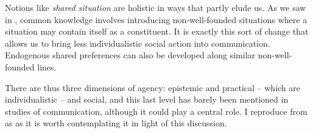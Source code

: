 Notions like \emph{shared situation} are holistic in ways that partly elude us. As we saw in , common knowledge involves introducing non-well-founded situations where a situation may contain itself as a constituent. It is exactly this sort of change that allows us to bring less individualistic social action into communication. Endogenous shared preferences can also be developed along similar non-well-founded lines.


There are thus three dimensions of agency: epistemic and practical -- which are individualistic -- and social, and this last level has barely been mentioned in studies of communication, although it could play a central role. I reproduce  from  as  as it is worth contemplating it in light of this discussion.

\begin{table}
\caption{Summary of Theories of Communication\label{table:table 2}} 
\end{table}

